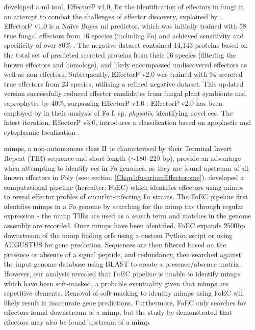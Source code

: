 \textcite{Sperschneider2016} developed a \ac{ml} tool, EffectorP v1.0, for the identification of effectors in fungi in an attempt to combat the challenges of effector discovery, explained by \textcite{Sperschneider2015, LoPresti2015}. EffectorP v1.0 is a Naïve Bayes \ac{ml} predictor, which was initially trained with 58 true fungal effectors from 16 species (including \ac{Fo}) and achieved sensitivity and specificity of over 80\% \parencite{Sperschneider2016}. The negative dataset contained 14,143 proteins based on the total set of predicted secreted proteins from their 16 species (filtering the known effectors and homologs), and likely encompassed undiscovered effectors as well as non-effectors. Subsequently, EffectorP v2.0 was trained with 94 secreted true effectors from 23 species, utilising a refined negative dataset. This updated version successfully reduced effector candidates from fungal plant symbionts and saprophytes by 40\%, surpassing EffectorP v1.0 \parencite{Sperschneider2018}. EffectorP v2.0 has been employed by \textcite{Simbaqueba2020} in their analysis of \ac{Fo} f. sp. \textit{physalis}, identifying novel \acp{ce}. The latest iteration, EffectorP v3.0, introduces a classification based on apoplastic and cytoplasmic localisation \parencite{Sperschneider2022}. 

\Acfp{mimp}, a non-autonomous class II \acl{te} characterised by their Terminal Invert Repeat (TIR) sequence and short length ($\sim$180–220 bp), provide an advantage when attempting to identify \acp{ce} in \ac{Fo} genomes, as they are found upstream of all known effectors in \ac{Foly} \parencite{Schmidt2013} (see: section \ref{Chap1:fusariumEffectorome}). \textcite{Dam2016} developed a computational pipeline (hereafter: FoEC) which identifies effectors using \acp{mimp} to reveal effector profiles of cucurbit-infecting \ac{Fo} strains. The FoEC pipeline first identifies \acp{mimp} in a \ac{Fo} genome by searching for the \ac{mimp} \acp{tir} through regular expression - the \ac{mimp} TIRs are used as a search term and matches in the genome assembly are recorded. Once \acp{mimp} have been identified, FoEC expands 2500bp downstream of the \ac{mimp} finding \acp{orf} using a custom Python script or using AUGUSTUS \parencite{Stanke2006} for gene prediction. Sequences are then filtered based on the presence or absence of a signal peptide, and redundancy, then searched against the input genome database using BLAST to create a presence/absence matrix. However, our analysis revealed that FoEC pipeline is unable to identify \acp{mimp} which have been soft-masked, a probable eventuality given that \acp{mimp} are repetitive elements. Removal of soft-masking to identify \acp{mimp} using FoEC will likely result in inaccurate gene predictions. Furthermore, FoEC only searches for effectors found downstream of a \ac{mimp}, but the study by \textcite{Schmidt2013} demonstrated that effectors may also be found upstream of a \ac{mimp}. 


